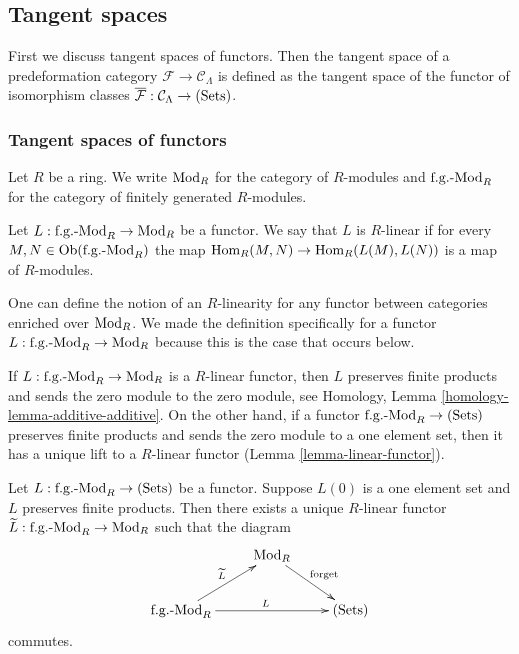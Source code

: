 \subsection{Tangent spaces}
First we discuss tangent spaces of functors. Then the tangent space of a 
predeformation category $\mathcal F \rightarrow \mathcal C_{\Lambda}$ is 
defined as the tangent space of the functor of isomorphism classes 
$\overline{\mathcal F}: \mathcal C_{\Lambda} \rightarrow \textnormal{(Sets)}$.

\subsubsection{Tangent spaces of functors}
Let $R$ be a ring. We write $\textnormal{Mod}_{R}$ for the category of 
$R$-modules and $\textnormal{f.g.-Mod}_{R}$ for the category of finitely 
generated $R$-modules.

\begin{definition}
Let $L: \textnormal{f.g.-Mod}_{R} \rightarrow \textnormal{Mod}_{R}$ be a 
functor.  We say that $L$ is $R$-linear if for every $M,N \in 
\textnormal{Ob}(\textnormal{f.g.-Mod}_{R})$ the map $\textnormal{Hom}_{R}(M,N) 
\rightarrow \textnormal{Hom}_{R}(L(M),L(N))$ is a map of $R$-modules.
\end{definition}

\begin{remark}
One can define the notion of an $R$-linearity for any functor between 
categories enriched over $\textnormal{Mod}_{R}$. We made the definition 
specifically for a functor $L: \textnormal{f.g.-Mod}_{R} \rightarrow 
\textnormal{Mod}_{R}$ because this is the case that occurs below.
\end{remark}

\begin{remark}
\label{remark-linear-functor}
If $L: \textnormal{f.g.-Mod}_{R} \rightarrow \textnormal{Mod}_{R}$ is a 
$R$-linear functor, then $L$ preserves finite products and sends the zero 
module to the zero module, see
Homology, Lemma \ref{homology-lemma-additive-additive}.
On the other hand, if a functor
$\textnormal{f.g.-Mod}_{R} \rightarrow \textnormal{(Sets)}$ 
preserves finite products and sends the zero module to a one element set, then 
it has a unique lift to a $R$-linear functor (Lemma \ref{lemma-linear-functor}).
\end{remark}

\begin{lemma}
\label{lemma-linear-functor}
Let $L: \textnormal{f.g.-Mod}_{R} \rightarrow \textnormal{(Sets)}$ be a 
functor.  Suppose $L(0)$ is a one element set and $L$ preserves finite 
products.  Then there exists a unique $R$-linear functor $\widetilde{L}: 
\textnormal{f.g.-Mod}_{R} \rightarrow \textnormal{Mod}_{R}$ such that the 
diagram
\[ 
\xymatrix{
& \textnormal{Mod}_{R} \ar[dr]^{\textnormal{forget}} &   \\
\textnormal{f.g.-Mod}_{R}  \ar[ur]^{\widetilde{L}} \ar[rr]^{L} &  & 
\textnormal{(Sets)}
}
\]
commutes.
\end{lemma}

